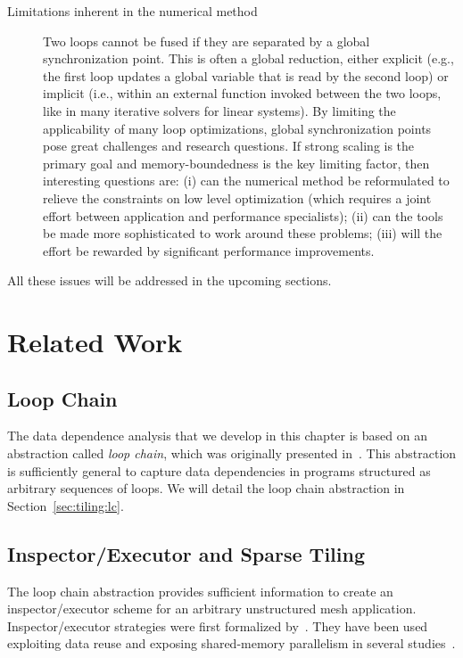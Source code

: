 \begin{description}
\item[Limitations inherent in the numerical method] Two loops cannot be fused if they are separated by a global synchronization point. This is often a global reduction, either explicit (e.g., the first loop updates a global variable that is read by the second loop) or implicit (i.e., within an external function invoked between the two loops, like in many iterative solvers for linear systems). By limiting the applicability of many loop optimizations, global synchronization points pose great challenges and research questions. If strong scaling is the primary goal and memory-boundedness is the key limiting factor, then interesting questions are: (i) can the numerical method be reformulated to relieve the constraints on low level optimization (which requires a joint effort between application and performance specialists); (ii) can the tools be made more sophisticated to work around these problems; (iii) will the effort be rewarded by significant performance improvements.
\end{description}

All these issues will be addressed in the upcoming sections.

\section{Related Work}
\label{sec:tiling:relatedwork}

\subsection*{Loop Chain}
The data dependence analysis that we develop in this chapter is based on an abstraction called \textit{loop chain}, which was originally presented in~\cite{ST-KriegerHIPS2013}. This abstraction is sufficiently general to capture data dependencies in programs structured as arbitrary sequences of loops. We will detail the loop chain abstraction in Section~\ref{sec:tiling:lc}.

\subsection*{Inspector/Executor and Sparse Tiling}
The loop chain abstraction provides sufficient information to create an inspector/executor scheme for an arbitrary unstructured mesh application. Inspector/executor strategies were first formalized by~\cite{ST-Saltz91}. They have been used exploiting data reuse and exposing shared-memory parallelism in several studies~\citep{ST-dimeEtna00,ST-StroutLCPC2002,ST-Demmel08,ST-KriegerIAAA2012}. 

